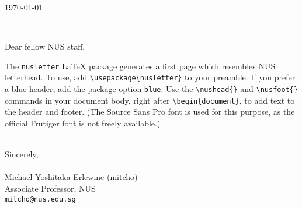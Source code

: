 \documentclass[a4paper]{article}
\begin{document}


\pagestyle{empty}

\noindent\today

\

\noindent Dear fellow NUS staff,

The \verb`nusletter` \LaTeX{} package generates a first page which resembles NUS letterhead. To use, add \verb`\usepackage{nusletter}` to your preamble. If you prefer a blue header, add the package option \verb`blue`. Use the \verb`\nushead{}` and \verb`\nusfoot{}` commands in your document body, right after \verb`\begin{document}`, to add text to the header and footer. (The Source Sans Pro font is used for this purpose, as the official Frutiger font is not freely available.)

\lipsum

\lipsum

\lipsum

\hspace*{3.5in}\begin{minipage}{3in}
\-\\Sincerely,\\
\\
Michael Yoshitaka Erlewine (mitcho)\\
Associate Professor, NUS\\
\texttt{mitcho@nus.edu.sg}
\end{minipage}
\end{document}
